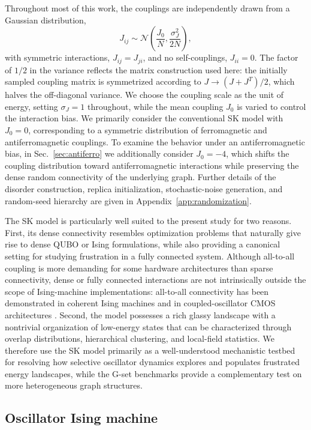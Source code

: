 \documentclass[
reprint,
amsmath,amssymb,
aps,
pre,
floatfix,
]{revtex4-2}
\begin{document}
Throughout most of this work, the couplings are independently drawn from a Gaussian distribution,
\begin{equation}
J_{ij}
\sim
\mathcal N\left(\frac{J_0}{N},\frac{\sigma_J^2}{2N}\right),
\end{equation}
with symmetric interactions, $J_{ij}=J_{ji}$, and no self-couplings, $J_{ii}=0$.
The factor of $1/2$ in the variance reflects the matrix construction used here: the initially sampled coupling matrix is symmetrized according to $J\rightarrow(J+J^{T})/2$, which halves the off-diagonal variance. We choose the coupling scale as the unit of energy, setting \(\sigma_J=1\) throughout, while the mean coupling \(J_0\) is varied to control the interaction bias. We primarily consider the conventional SK model with $J_0=0$, corresponding to a symmetric distribution of ferromagnetic and antiferromagnetic couplings. To examine the behavior under an antiferromagnetic bias, in Sec.~\ref{sec:antiferro} we additionally consider $J_0=-4$, which shifts the coupling distribution toward antiferromagnetic interactions while preserving the dense random connectivity of the underlying graph.
Further details of the disorder construction, replica initialization,
stochastic-noise generation, and random-seed hierarchy are given in
Appendix~\ref{app:randomization}.

The SK model is particularly well suited to the present study for two
reasons. First, its dense connectivity resembles optimization problems that
naturally give rise to dense QUBO or Ising formulations, while also providing
a canonical setting for studying frustration in a fully connected system.
Although all-to-all coupling is more demanding for some hardware
architectures than sparse connectivity, dense or fully connected interactions
are not intrinsically outside the scope of Ising-machine implementations:
all-to-all connectivity has been demonstrated in coherent Ising machines
\cite{machines2} and in coupled-oscillator CMOS architectures
\cite{Lo2023,Budrikis2024}. Second, the model possesses a rich glassy landscape with a
nontrivial organization of low-energy states that can be characterized
through overlap distributions, hierarchical clustering, and local-field
statistics. We therefore use the SK model primarily as a well-understood
mechanistic testbed for resolving how selective oscillator dynamics explores
and populates frustrated energy landscapes, while the G-set benchmarks
provide a complementary test on more heterogeneous graph structures.


\subsection{Oscillator Ising machine}
\end{document}
